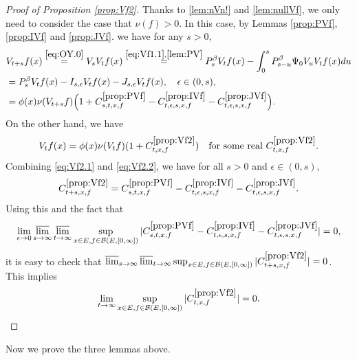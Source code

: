 \documentclass[12pt,a4paper]{amsart}
\numberwithin{equation}{section}
\theoremstyle{plain}
\theoremstyle{definition}
\theoremstyle{remark}
\begin{document}
\begin{proof}[{Proof of Proposition \ref{prop:Vf2}}]
Thanks to \eqref{lem:nVn!} and \eqref{lem:nullVf}, we only need to consider the case that $\nu(f)>0$.
	In this case,
by Lemmas \ref{prop:PVf}, \ref{prop:IVf} and \ref{prop:JVf}.
we have for any $s>0$,
\begin{align}
	& V_{t+s}f (x)
	\overset{\eqref{eq:OY.0}}= V_s V_t f(x)
	\overset{\eqref{eq:Vf1.1},\eqref{lem:PV}}= P_s^\beta V_t f(x) - \int_0^s P^\beta_{s-u}\Psi_0 V_uV_t f(x) du
	\\&= P_s^\beta V_t f(x) - I_{s,\epsilon} V_tf(x) - J_{s,\epsilon} V_t f(x), \quad \epsilon\in (0,s),
	\\\label{eq:Vf2.1} &=\phi(x)\nu(V_{t+s}f) \Big( 1+ C^{\ref{prop:PVf}}_{s,t,x,f} - C^{\ref{prop:IVf}}_{t,\epsilon, s, x,f}- C^{\ref{prop:JVf}}_{t,\epsilon,s,x,f}\Big).
\end{align}
	On the other hand, we have
\begin{align}\label{eq:Vf2.2}
	V_{t}f (x)
	= \phi(x) \nu(V_{t}f) (1+ C^{\ref{prop:Vf2}}_{t,x,f})
	\quad \text{for some real $C^{\ref{prop:Vf2}}_{t,x,f}$}.
\end{align}
	Combining \eqref{eq:Vf2.1} and \eqref{eq:Vf2.2}, we have for all $s>0$ and $\epsilon \in (0,s)$,
\[
	C^{\ref{prop:Vf2}}_{t+s,x,f} = C^{\ref{prop:PVf}}_{s,t,x,f} - C^{\ref{prop:IVf}}_{t,\epsilon, s, x,f}- C^{\ref{prop:JVf}}_{t,\epsilon,s,x,f}.
\]
	 Using this and the fact that
\[
	\lim_{\epsilon \to 0}\varlimsup_{s\to \infty}\varlimsup_{t\to \infty}
	\sup_{x\in E, f\in \mathcal B(E,[0,\infty])}
	|C^{\ref{prop:PVf}}_{s,t,x,f} - C^{\ref{prop:IVf}}_{t,\epsilon, s, x,f}- C^{\ref{prop:JVf}}_{t,\epsilon,s,x,f}|=0,
\]
	it is easy to check that $\varlimsup_{s\to \infty}\varlimsup_{t\to \infty}
\sup_{x\in E, f\in \mathcal B(E,[0,\infty])}
	|C^{\ref{prop:Vf2}}_{t+s,x,f}|=0$.
	This implies
\[
	\lim_{t\to \infty} 
\sup_{x\in E, f\in \mathcal B(E,[0,\infty])}
	|C^{\ref{prop:Vf2}}_{t,x,f}|=0.
	\qedhere
\]
\end{proof}

	Now we prove the three lemmas above.
\end{document}
